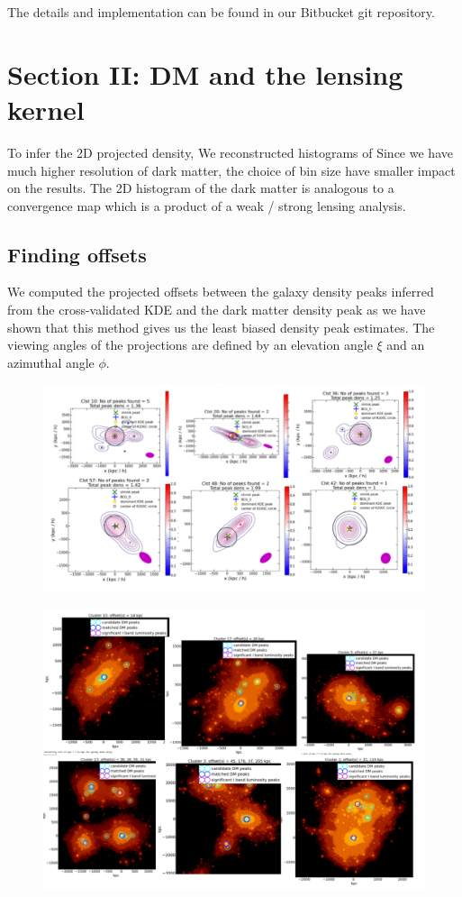 \documentclass[usenatbib]{mn2e}
\begin{document}
The details and implementation can be found in our Bitbucket git repository.



\section{Section II: DM and the lensing kernel}
To infer the 2D projected density, We reconstructed histograms of 
Since we have much higher resolution of dark matter, the choice of bin size
have smaller impact on the results.
The 2D histogram of the dark matter is analogous to a convergence map which is
a product of a weak / strong lensing analysis. 


\subsection{Finding offsets} 
We computed the projected offsets between the galaxy density peaks inferred from the
cross-validated KDE and the dark matter density peak as we have shown that this
method gives us the least biased density peak estimates. 
The viewing angles of the projections are defined by an elevation angle
$\xi$ and an azimuthal angle $\phi$. 

\begin{figure}
	\includegraphics[width=.95\linewidth]{figures/ph_fig_galaxycenter_IllustrisClusters.pdf}
	\caption{
		\label{fig:config}}
\end{figure}


\begin{figure}
	\includegraphics[width=.95\linewidth]{figures/ph_fig_DMcenter_IllustrisClusters.pdf}
	\caption{
		\label{fig:config}}
\end{figure}
\end{document}
